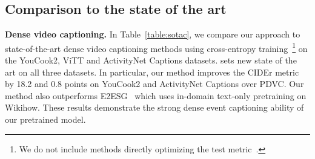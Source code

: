 \begin{table}[t]
\begin{center}
\setlength\tabcolsep{5pt}
\vspace{-0.3cm}
\caption{\small Comparison to the state of the art for event localization. * Results provided by the authors.  Results of our experiments using the official codebase.}  
\label{table:sotal}
\end{center}
\vspace{-0.9cm}
\end{table}

\subsection{Comparison to the state of the art}\label{sec:sota}
\noindent \textbf{Dense video captioning.} 
In Table~\ref{table:sotac}, we compare our approach to state-of-the-art dense video captioning methods using cross-entropy training~\footnote{We do not include methods directly optimizing the test metric~\cite{deng2021sketch, mun2019streamlined}.} on the YouCook2, ViTT and ActivityNet Captions datasets.
\model{} sets new state of the art on all three datasets.
In particular, our method improves the CIDEr metric by 18.2 and 0.8 points on YouCook2 and ActivityNet Captions over PDVC.
Our method also outperforms E2ESG~\cite{zhu2022end} which uses in-domain text-only pretraining on Wikihow.
These results demonstrate the strong dense event captioning ability of our pretrained \model{} model.

